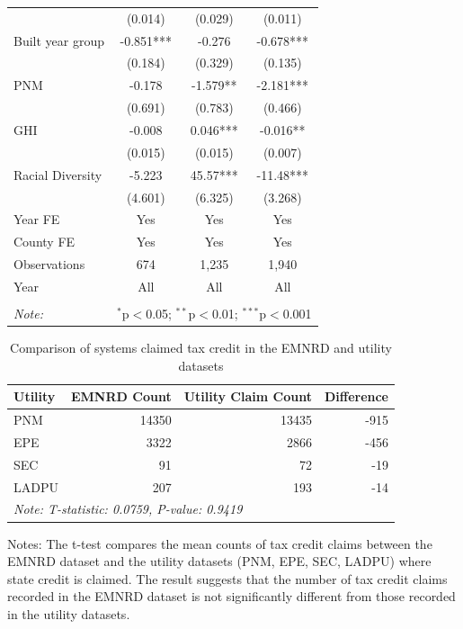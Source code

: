 \documentclass[11pt,twoside,letterpaper]{article}
\begin{document}
\begin{table}[H]
{\begin{tabular}{lccc}
 & (0.014) & (0.029) & (0.011) \\
Built year group & -0.851*** & -0.276 & -0.678*** \\
 & (0.184) & (0.329) & (0.135) \\
PNM & -0.178 & -1.579** & -2.181*** \\
 & (0.691) & (0.783) & (0.466) \\
GHI & -0.008 & 0.046*** & -0.016** \\
 & (0.015) & (0.015) & (0.007) \\
Racial Diversity & -5.223 & 45.57*** & -11.48*** \\
 & (4.601) & (6.325) & (3.268) \\ \cline{1-4}
Year FE & Yes & Yes & Yes \\
County FE & Yes & Yes & Yes \\
Observations & 674 & 1,235 & 1,940 \\
Year & All & All & All \\ 
\hline
\hline \\[-1.8ex]
\textit{Note:} & \multicolumn{3}{r}{$^{*}$p$<$0.05; $^{**}$p$<$0.01; $^{***}$p$<$0.001} \\
\end{tabular}}
\end{table}






\begin{table}[H] 
\caption{Comparison of systems claimed tax credit in the EMNRD and utility datasets}
\label{tab:compare_emnrd_utility}
\centering
\begin{tabular}{lrrr}
\toprule
Utility & EMNRD Count & Utility Claim Count & Difference \\
\midrule
PNM & 14350 & 13435 & -915 \\
EPE & 3322 & 2866 & -456 \\
SEC & 91 & 72 & -19 \\
LADPU & 207 & 193 & -14 \\
\bottomrule
\multicolumn{4}{l}{\textit{Note:  T-statistic: 0.0759, P-value: 0.9419}} \\
\end{tabular}


\begin{flushleft}\footnotesize{Notes: The t-test compares the mean counts of tax credit claims between the EMNRD dataset and the utility datasets (PNM, EPE, SEC, LADPU) where state credit is claimed. The result suggests that the number of tax credit claims recorded in the EMNRD dataset is not significantly different from those recorded in the utility datasets.}
\end{flushleft}
\end{table}
\end{document}
